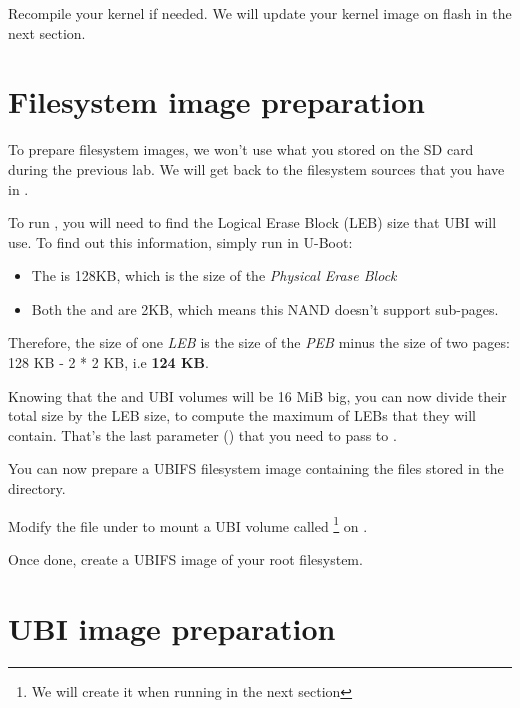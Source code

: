Recompile your kernel if needed. We will update your kernel image on flash
in the next section.

\section{Filesystem image preparation}

To prepare filesystem images, we won't use what you stored on the SD
card during the previous lab. We will get back to the filesystem sources
that you have in .

To run , you will need to find the Logical Erase
Block (LEB) size that UBI will use. To find out this information,
simply run  in U-Boot:

\begin{itemize}

\item The  is 128KB, which is the size of the {\em
    Physical Erase Block}

\item Both the  and  are 2KB, which
  means this NAND doesn't support sub-pages.

\end{itemize}

Therefore, the size of one {\em LEB} is the size of the {\em PEB}
minus the size of two pages: 128 KB - 2 * 2 KB, i.e {\bf 124 KB}.

Knowing that the  and  UBI volumes will be 16
MiB big, you can now divide their total size by the LEB size, to compute
the maximum of LEBs that they will contain. That's the last parameter
() that you need to pass to .

You can now prepare a UBIFS filesystem image containing the files
stored in the  directory.

Modify the  file under  to mount a
UBI volume called  \footnote{We will create it when
running  in the next section} on .

Once done, create a UBIFS image of your root filesystem.

\section{UBI image preparation}

